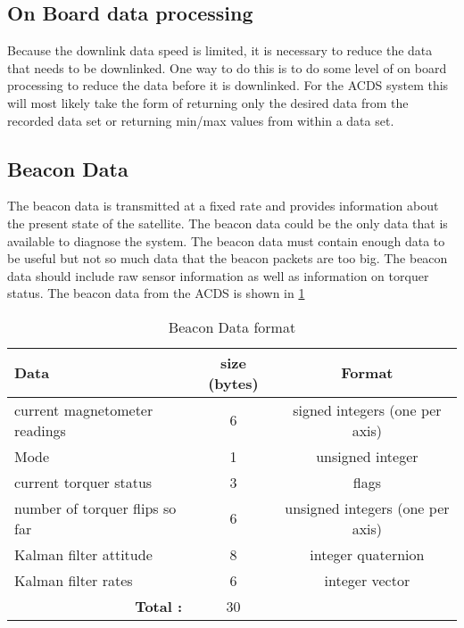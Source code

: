 \subsection{On Board data processing}

Because the downlink data speed is limited, it is necessary to reduce the data that needs to be downlinked. One way to do this is to do some level of on board processing to reduce the data before it is downlinked. For the \ac{ACDS} system this will most likely take the form of returning only the desired data from the recorded data set or returning min/max values from within a data set. 

\subsection{Beacon Data}

The beacon data is transmitted at a fixed rate and provides information about the present state of the satellite. The beacon data could be the only data that is available to diagnose the system. The beacon data must contain enough data to be useful but not so much data that the beacon packets are too big. The beacon data should include raw sensor information as well as information on torquer status. The beacon data from the \ac{ACDS} is shown in \cref{tab:beacondat}

\begin{table}[H]
    \centering
    \caption{Beacon Data format}
    \label{tab:beacondat}
    \begin{tabular}{|l|c|c|}
        \hline
        Data&size (bytes)&Format\\
        \hline
        current magnetometer readings&6&signed integers (one per axis)\\
        \hline
        Mode&1&unsigned integer\\
        \hline
        current torquer status&3&flags\\
        \hline
        number of torquer flips so far & 6 & unsigned integers (one per axis)\\
        \hline
        Kalman filter attitude&8&integer quaternion\\
        \hline
        Kalman filter rates&6&integer vector\\
        \hline
        \multicolumn{1}{|r|}{\bfseries Total :}&30&\\
        \hline
    \end{tabular}
\end{table}

